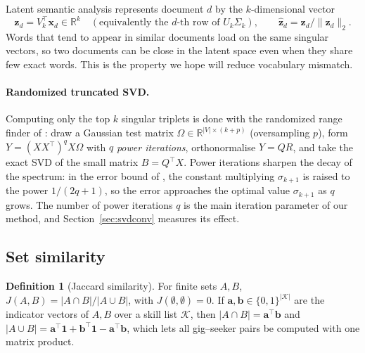 \documentclass[12pt,a4paper]{article}
\numberwithin{equation}{section}
\theoremstyle{definition}
\newtheorem{definition}{Definition}[section]
\theoremstyle{plain}
\newcommand{\R}{\mathbb{R}}
\begin{document}
Latent semantic analysis \citep{deerwester1990lsa} represents document $d$ by the $k$-dimensional vector
\begin{equation}
  \bm{z}_d = V_k^\top\bm{x}_d \in\R^k \quad(\text{equivalently the $d$-th row of } U_k\Sigma_k), \qquad \hat{\bm{z}}_d = \bm{z}_d/\|\bm{z}_d\|_2 .
  \label{eq:lsa}
\end{equation}
Words that tend to appear in similar documents load on the same singular vectors, so two documents can be close in the latent space even when they share few exact words. This is the property we hope will reduce vocabulary mismatch.

\paragraph{Randomized truncated SVD.} Computing only the top $k$ singular triplets is done with the randomized range finder of \citet{halko2011finding}: draw a Gaussian test matrix $\Omega\in\R^{|V|\times(k+p)}$ (oversampling $p$), form $Y=(XX^\top)^qX\Omega$ with $q$ \emph{power iterations}, orthonormalise $Y=QR$, and take the exact SVD of the small matrix $B=Q^\top X$. Power iterations sharpen the decay of the spectrum: in the error bound of \citet{halko2011finding}, the constant multiplying $\sigma_{k+1}$ is raised to the power $1/(2q+1)$, so the error approaches the optimal value $\sigma_{k+1}$ as $q$ grows. The number of power iterations $q$ is the main iteration parameter of our method, and Section~\ref{sec:svdconv} measures its effect.

\subsection{Set similarity}
\begin{definition}[Jaccard similarity]
For finite sets $A,B$, $J(A,B)=|A\cap B|/|A\cup B|$, with $J(\emptyset,\emptyset)=0$. If $\bm{a},\bm{b}\in\{0,1\}^{|\mathcal{K}|}$ are the indicator vectors of $A,B$ over a skill list $\mathcal{K}$, then $|A\cap B|=\bm{a}^\top\bm{b}$ and $|A\cup B| = \bm{a}^\top\bm{1}+\bm{b}^\top\bm{1}-\bm{a}^\top\bm{b}$, which lets all gig--seeker pairs be computed with one matrix product.
\end{definition}
\end{document}
